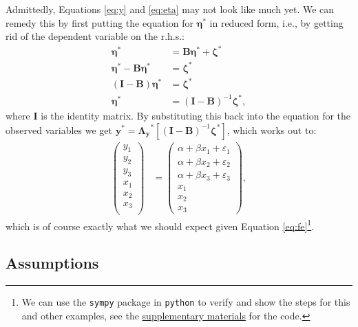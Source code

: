 \documentclass[]{interact}
\theoremstyle{plain}%
\theoremstyle{definition}
\theoremstyle{remark}
\begin{document}
Admittedly, Equations \eqref{eq:y} and \eqref{eq:eta} may not look like
much yet. We can remedy this by first putting the equation for
\(\bm{\eta}^{*}\) in reduced form, i.e., by getting rid of the dependent
variable on the r.h.s.: \begin{align}
\bm{\eta}^{*} & = \bm{B}\bm{\eta}^{*} + \bm{\zeta}^{*} \\
\bm{\eta}^{*} - \bm{B}\bm{\eta}^{*} & = \bm{\zeta}^{*} \\
(\bm{I} - \bm{B})\bm{\eta}^{*} & = \bm{\zeta}^{*} \\
\bm{\eta}^{*} & = (\bm{I} - \bm{B})^{-1}\bm{\zeta}^{*},
\end{align} where \(\bm{I}\) is the identity matrix. By substituting
this back into the equation for the observed variables we get
\(\bm{y}^{*} = \bm{\Lambda_{y}}^{*}[(\bm{I} - \bm{B})^{-1}\bm{\zeta}^{*}]\),
which works out to: \begin{align}
\begin{pmatrix} 
y_{1} \\
y_{2} \\
y_{3} \\
x_{1} \\
x_{2} \\
x_{3} \\
\end{pmatrix} & = 
\begin{pmatrix}
\alpha + \beta x_{1} + \varepsilon_{1} \\
\alpha + \beta x_{2} + \varepsilon_{2} \\
\alpha + \beta x_{3} + \varepsilon_{3} \\
x_{1} \\
x_{2} \\
x_{3}
\end{pmatrix},
\end{align} which is of course exactly what we should expect given
Equation \eqref{eq:fe}\footnote{We can use the \texttt{sympy} package in
  \texttt{python} to verify and show the steps for this and other
  examples, see the
  \href{https://github.com/henrik-andersen/FE-SEM/blob/master/sympy-doublecheck-matrixnotation.py}{supplementary
  materials} for the code.}.

\hypertarget{assumptions}{%
\subsection{Assumptions}\label{assumptions}}
\end{document}
